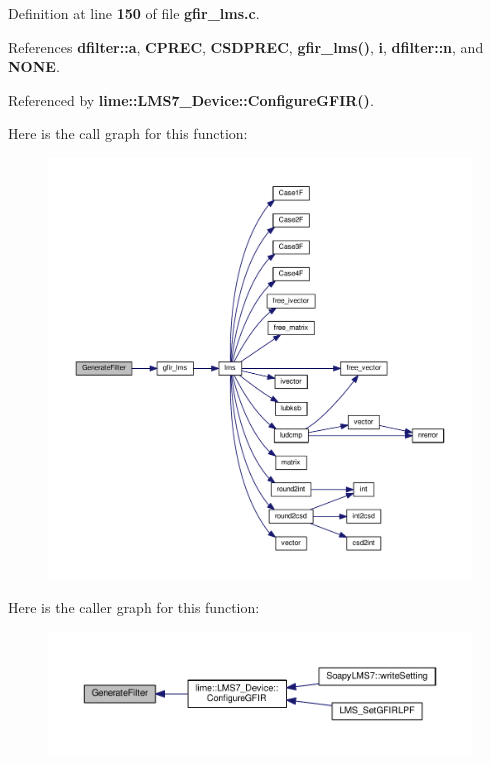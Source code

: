 Definition at line {\bf 150} of file {\bf gfir\+\_\+lms.\+c}.



References {\bf dfilter\+::a}, {\bf C\+P\+R\+EC}, {\bf C\+S\+D\+P\+R\+EC}, {\bf gfir\+\_\+lms()}, {\bf i}, {\bf dfilter\+::n}, and {\bf N\+O\+NE}.



Referenced by {\bf lime\+::\+L\+M\+S7\+\_\+\+Device\+::\+Configure\+G\+F\+I\+R()}.



Here is the call graph for this function\+:
\nopagebreak
\begin{figure}[H]
\begin{center}
\leavevmode
\includegraphics[width=350pt]{d0/db7/lms__gfir_8h_aece642dbd2b79ac92bf1d0003110e5e0_cgraph}
\end{center}
\end{figure}




Here is the caller graph for this function\+:
\nopagebreak
\begin{figure}[H]
\begin{center}
\leavevmode
\includegraphics[width=350pt]{d0/db7/lms__gfir_8h_aece642dbd2b79ac92bf1d0003110e5e0_icgraph}
\end{center}
\end{figure}


